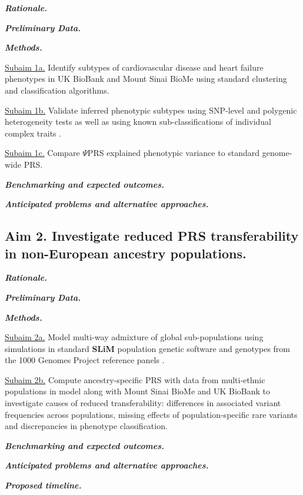 \documentclass[11pt]{article}  %
\newlength\tindent
\renewcommand{\indent}{\hspace*{\tindent}}
\begin{document}
\indent \textbf{\textit{Rationale.}}

\indent \textbf{\textit{Preliminary Data.}}

\indent \textbf{\textit{Methods.}}

\indent \underline{Subaim 1a.} Identify subtypes of cardiovascular disease and heart failure phenotypes in UK BioBank and Mount Sinai BioMe using standard clustering and classification algorithms. 

\indent \underline{Subaim 1b.} Validate inferred phenotypic subtypes using SNP-level \cite{dahl_reverse_2019} and polygenic heterogeneity tests \cite{dahl_robust_2020} as well as using known sub-classifications of individual complex traits \cite{li_identification_2015}. 

\indent \underline{Subaim 1c.} Compare $\Psi$PRS explained phenotypic variance to standard genome-wide PRS.

\indent \textbf{\textit{Benchmarking and expected outcomes.}}


\indent \textbf{\textit{Anticipated problems and alternative approaches.}}

\subsection*{Aim 2. Investigate reduced PRS transferability in non-European ancestry populations.}

\indent \textbf{\textit{Rationale.}}

\indent \textbf{\textit{Preliminary Data.}}

\indent \textbf{\textit{Methods.}}






\indent \underline{Subaim 2a.} Model multi-way admixture of global sub-populations using simulations in standard \textbf{SLiM} population genetic software \cite{haller_slim_2019} and genotypes from the 1000 Genomes Project reference panels \cite{noauthor_global_2015}.

\indent \underline{Subaim 2b.} Compute ancestry-specific PRS with data from multi-ethnic populations in model along with Mount Sinai BioMe and UK BioBank to investigate causes of reduced transferability: differences in associated variant frequencies across populations, missing effects of population-specific rare variants and discrepancies in phenotype classification. 

\indent \textbf{\textit{Benchmarking and expected outcomes.}}


\indent \textbf{\textit{Anticipated problems and alternative approaches.}}


\textbf{\textit{Proposed timeline.}}






\newpage

\end{document}
